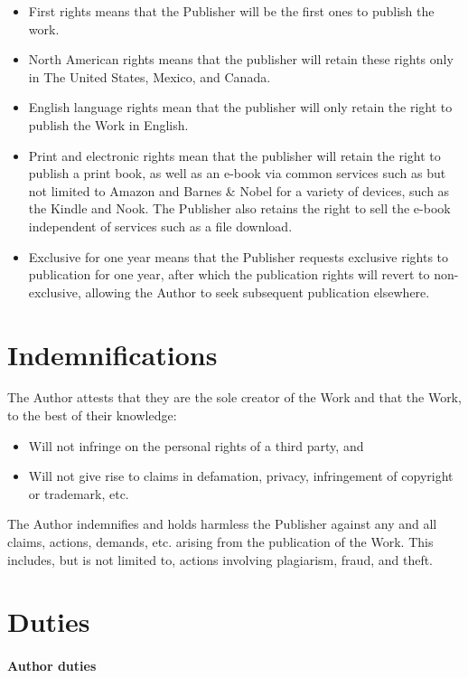 \documentclass[12pt,letterpaper]{article}
\begin{document}
\begin{itemize}
    \item First rights means that the Publisher will be the first ones to publish the work.
    \item North American rights means that the publisher will retain these rights only in The United States, Mexico, and Canada.
    \item English language rights mean that the publisher will only retain the right to publish the Work in English.
    \item Print and electronic rights mean that the publisher will retain the right to publish a print book, as well as an e-book via common services such as but not limited to Amazon and Barnes \& Nobel for a variety of devices, such as the Kindle and Nook. The Publisher also retains the right to sell the e-book independent of services such as a file download.
    \item Exclusive for one year means that the Publisher requests exclusive rights to publication for one year, after which the publication rights will revert to non-exclusive, allowing the Author to seek subsequent publication elsewhere.
\end{itemize}

\section{Indemnifications}

The Author attests that they are the sole creator of the Work and that the Work, to the best of their knowledge:

\begin{itemize}
    \item Will not infringe on the personal rights of a third party, and
    \item Will not give rise to claims in defamation, privacy, infringement of copyright or trademark, etc.
\end{itemize}

The Author indemnifies and holds harmless the Publisher against any and all claims, actions, demands, etc. arising from the publication of the Work. This includes, but is not limited to, actions involving plagiarism, fraud, and theft.

\section{Duties}

\paragraph{Author duties}
\end{document}
